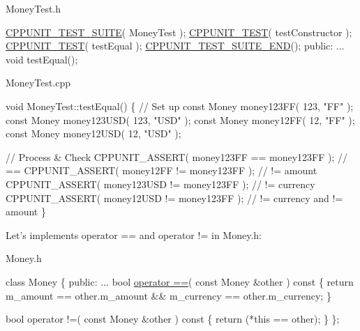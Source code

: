 {\ttfamily Money\+Test.\+h} 
\begin{DoxyCode}
  \hyperlink{group___writing_test_fixture_gabe1e12200f40d6f25d60c1783c99da81}{CPPUNIT\_TEST\_SUITE}( MoneyTest );
  \hyperlink{group___writing_test_fixture_gaac9b03d898b207e1daf2f93867935a96}{CPPUNIT\_TEST}( testConstructor );
  \hyperlink{group___writing_test_fixture_gaac9b03d898b207e1daf2f93867935a96}{CPPUNIT\_TEST}( testEqual );
  \hyperlink{group___writing_test_fixture_ga601b2e1d525f3947b216e28c625abcb1}{CPPUNIT\_TEST\_SUITE\_END}();
\textcolor{keyword}{public}:
  ...
  \textcolor{keywordtype}{void} testEqual();
\end{DoxyCode}


{\ttfamily Money\+Test.\+cpp} 
\begin{DoxyCode}
\textcolor{keywordtype}{void}
MoneyTest::testEqual()
\{
  \textcolor{comment}{// Set up}
  \textcolor{keyword}{const} Money money123FF( 123, \textcolor{stringliteral}{"FF"} );
  \textcolor{keyword}{const} Money money123USD( 123, \textcolor{stringliteral}{"USD"} );
  \textcolor{keyword}{const} Money money12FF( 12, \textcolor{stringliteral}{"FF"} );
  \textcolor{keyword}{const} Money money12USD( 12, \textcolor{stringliteral}{"USD"} );

  \textcolor{comment}{// Process & Check}
  CPPUNIT\_ASSERT( money123FF == money123FF );     \textcolor{comment}{// ==}
  CPPUNIT\_ASSERT( money12FF != money123FF );      \textcolor{comment}{// != amount}
  CPPUNIT\_ASSERT( money123USD != money123FF );    \textcolor{comment}{// != currency}
  CPPUNIT\_ASSERT( money12USD != money123FF );     \textcolor{comment}{// != currency and != amount}
\}
\end{DoxyCode}


Let's implements {\ttfamily operator} {\ttfamily ==} and {\ttfamily operator} {\ttfamily !=} in Money.\+h\+:

{\ttfamily Money.\+h} 
\begin{DoxyCode}
\textcolor{keyword}{class }Money
\{
\textcolor{keyword}{public}:
...
  \textcolor{keywordtype}{bool} \hyperlink{group___a_p_i___o_g_l_e_s2_ga8425a5ca2f4117542f2cb1c12ded2236}{operator ==}( \textcolor{keyword}{const} Money &other )\textcolor{keyword}{ const}
\textcolor{keyword}{  }\{
    \textcolor{keywordflow}{return} m\_amount == other.m\_amount  &&  
           m\_currency == other.m\_currency;
  \}

  \textcolor{keywordtype}{bool} operator !=( \textcolor{keyword}{const} Money &other )\textcolor{keyword}{ const}
\textcolor{keyword}{  }\{
    \textcolor{keywordflow}{return} (*\textcolor{keyword}{this} == other);
  \}
\};
\end{DoxyCode}


